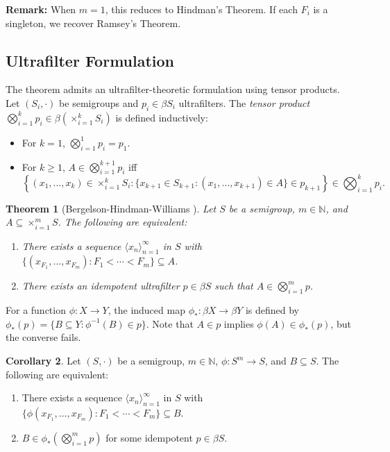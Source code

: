 \documentclass[12pt]{amsart}
\theoremstyle{plain}
\newtheorem{theorem}{Theorem}[section]
\theoremstyle{definition}
\newtheorem{corollary}[theorem]{Corollary}
\theoremstyle{remark}
\numberwithin{equation}{section}
\begin{document}
\textbf{Remark:} When $m=1$, this reduces to Hindman's Theorem. If each $F_i$ is a singleton, we recover Ramsey's Theorem.

\subsection{Ultrafilter Formulation}
The theorem admits an ultrafilter-theoretic formulation using tensor products. Let $(S_i, \cdot)$ be semigroups and $p_i \in \beta S_i$ ultrafilters. The \textit{tensor product} $\bigotimes_{i=1}^k p_i \in \beta\left(\times_{i=1}^k S_i\right)$ is defined inductively:
\begin{itemize}
  \item For $k=1$, $\bigotimes_{i=1}^1 p_i = p_1$.
  \item For $k \geq 1$, $A \in \bigotimes_{i=1}^{k+1} p_i$ iff 
  \[
    \left\{(x_1, \dots, x_k) \in \times_{i=1}^k S_i : \{x_{k+1} \in S_{k+1} : (x_1, \dots, x_{k+1}) \in A\} \in p_{k+1}\right\} \in \bigotimes_{i=1}^k p_i.
  \]
\end{itemize}

\begin{theorem}[Bergelson-Hindman-Williams \cite{BHW14}]\label{thm:BHW}
  Let $S$ be a semigroup, $m \in \mathbb{N}$, and $A \subseteq \times _{i=1}^m S$. The following are equivalent:
  \begin{enumerate}
    \item There exists a sequence $\langle x_n \rangle_{n=1}^\infty$ in $S$ with $\{(x_{F_1}, \dots, x_{F_m}) : F_1 < \cdots < F_m\} \subseteq A$.
    \item There exists an idempotent ultrafilter $p \in \beta S$ such that $A \in \bigotimes_{i=1}^m p$.
  \end{enumerate}
\end{theorem}

For a function $\phi: X \to Y$, the induced map $\phi_*: \beta X \to \beta Y$ is defined by $\phi_*(p) = \{B \subseteq Y : \phi^{-1}(B) \in p\}$. Note that $A \in p$ implies  $\phi(A) \in \phi_*(p)$, but the converse fails.

\begin{corollary}\label{cor:tensor-product}
  Let $(S, \cdot)$ be a semigroup, $m \in \mathbb{N}$, $\phi: S^m \to S$, and $B \subseteq S$. The following are equivalent:
  \begin{enumerate}
    \item There exists a sequence $\langle x_n \rangle_{n=1}^\infty$ in $S$ with $\{\phi(x_{F_1}, \dots, x_{F_m}) : F_1 < \cdots < F_m\} \subseteq B$.
    \item $B \in \phi_*\left(\bigotimes_{i=1}^m p\right)$ for some idempotent $p \in \beta S$.
  \end{enumerate}
\end{corollary}
\end{document}
